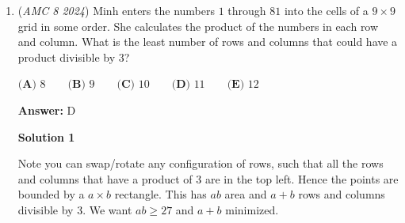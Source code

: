 \begin{enumerate}
 Since $\overline{BUG}$ is a $3$-digit number,
 \[100\le 8\overline{FLY}\le 999 \quad\Rightarrow\quad 13\le \overline{FLY}\le 124.\]To maximize $\overline{FLYFLY}$, maximize $\overline{FLY}$.

 Try the largest possible value:
 \[\overline{FLY}=123 \quad\Rightarrow\quad \overline{BUG}=8\cdot 123=984.\]The digits $\{1,2,3,9,8,4\}$ are all distinct, so this works and is maximal.

 Therefore,
 \[\overline{FLY}+\overline{BUG}=123+984=1107.\]

 \[\boxed{1107}\]




\textbf{Solution 2}

The divisibility rule for $8$ is that the last $3$ digits need to be divisible by $8$. That means that $BUG$ needs to be a multiple of $8$ with distinct digits. And since multiplying $8$ by $FLY$ gives $BUG$, we know that the number needs to be a product of $8$ and a $3$ digit number. From the more foundational multiplication facts, we know that $125\cdot 8 = 1000$. Moving down from there, we can try $124 * 8 = 992$. This won't work because $992$ does not have distinct digits. Next, we can try $123 * 8 = 984$. $1, 2, 3, 9, 8,$ and $4$ are all distinct digits. That means that $FLY = 123$ and $BUG = 984$. $123 + 984 = 1107$, so the answer is $\boxed C$. Note that while guessing and checking multiples of $8$ sounds like an unreliable strategy, we know that the number needs to be $8\cdot FLYFLY$, which would for certain be a large number. 

 -mathdragonmochi

 


	\item (\textit{AMC 8 2024}) Minh enters the numbers $1$ through $81$ into the cells of a $9 \times 9$ grid in some order. She calculates the product of the numbers in each row and column. What is the least number of rows and columns that could have a product divisible by $3$?


 $\textbf{(A) } 8\qquad\textbf{(B) } 9\qquad\textbf{(C) } 10\qquad\textbf{(D) } 11\qquad\textbf{(E) } 12$

 \textbf{Answer: }D



\textbf{Solution 1}

Note you can swap/rotate any configuration of rows, such that all the rows and columns that have a product of 3 are in the top left. Hence the points are bounded by a $a \times b$ rectangle. This has $ab$ area and $a+b$ rows and columns divisible by $3$. We want $ab\ge 27$ and $a+b$ minimized. 


\end{enumerate}
